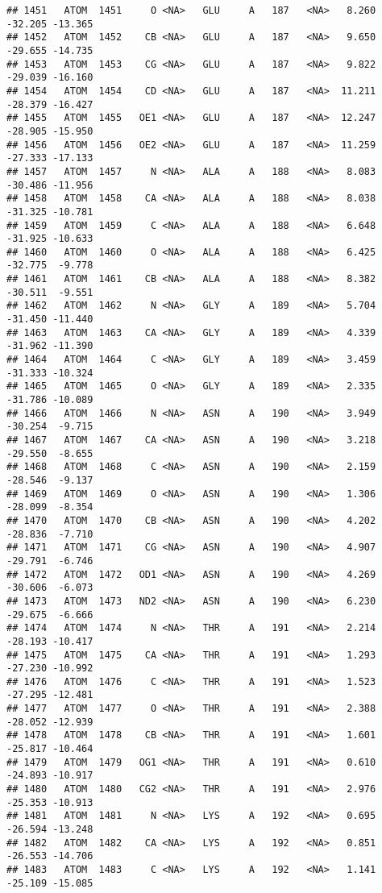 \documentclass[
]{article}
\begin{document}
\begin{verbatim}
## 1451   ATOM  1451     O <NA>   GLU     A   187   <NA>   8.260 -32.205 -13.365
## 1452   ATOM  1452    CB <NA>   GLU     A   187   <NA>   9.650 -29.655 -14.735
## 1453   ATOM  1453    CG <NA>   GLU     A   187   <NA>   9.822 -29.039 -16.160
## 1454   ATOM  1454    CD <NA>   GLU     A   187   <NA>  11.211 -28.379 -16.427
## 1455   ATOM  1455   OE1 <NA>   GLU     A   187   <NA>  12.247 -28.905 -15.950
## 1456   ATOM  1456   OE2 <NA>   GLU     A   187   <NA>  11.259 -27.333 -17.133
## 1457   ATOM  1457     N <NA>   ALA     A   188   <NA>   8.083 -30.486 -11.956
## 1458   ATOM  1458    CA <NA>   ALA     A   188   <NA>   8.038 -31.325 -10.781
## 1459   ATOM  1459     C <NA>   ALA     A   188   <NA>   6.648 -31.925 -10.633
## 1460   ATOM  1460     O <NA>   ALA     A   188   <NA>   6.425 -32.775  -9.778
## 1461   ATOM  1461    CB <NA>   ALA     A   188   <NA>   8.382 -30.511  -9.551
## 1462   ATOM  1462     N <NA>   GLY     A   189   <NA>   5.704 -31.450 -11.440
## 1463   ATOM  1463    CA <NA>   GLY     A   189   <NA>   4.339 -31.962 -11.390
## 1464   ATOM  1464     C <NA>   GLY     A   189   <NA>   3.459 -31.333 -10.324
## 1465   ATOM  1465     O <NA>   GLY     A   189   <NA>   2.335 -31.786 -10.089
## 1466   ATOM  1466     N <NA>   ASN     A   190   <NA>   3.949 -30.254  -9.715
## 1467   ATOM  1467    CA <NA>   ASN     A   190   <NA>   3.218 -29.550  -8.655
## 1468   ATOM  1468     C <NA>   ASN     A   190   <NA>   2.159 -28.546  -9.137
## 1469   ATOM  1469     O <NA>   ASN     A   190   <NA>   1.306 -28.099  -8.354
## 1470   ATOM  1470    CB <NA>   ASN     A   190   <NA>   4.202 -28.836  -7.710
## 1471   ATOM  1471    CG <NA>   ASN     A   190   <NA>   4.907 -29.791  -6.746
## 1472   ATOM  1472   OD1 <NA>   ASN     A   190   <NA>   4.269 -30.606  -6.073
## 1473   ATOM  1473   ND2 <NA>   ASN     A   190   <NA>   6.230 -29.675  -6.666
## 1474   ATOM  1474     N <NA>   THR     A   191   <NA>   2.214 -28.193 -10.417
## 1475   ATOM  1475    CA <NA>   THR     A   191   <NA>   1.293 -27.230 -10.992
## 1476   ATOM  1476     C <NA>   THR     A   191   <NA>   1.523 -27.295 -12.481
## 1477   ATOM  1477     O <NA>   THR     A   191   <NA>   2.388 -28.052 -12.939
## 1478   ATOM  1478    CB <NA>   THR     A   191   <NA>   1.601 -25.817 -10.464
## 1479   ATOM  1479   OG1 <NA>   THR     A   191   <NA>   0.610 -24.893 -10.917
## 1480   ATOM  1480   CG2 <NA>   THR     A   191   <NA>   2.976 -25.353 -10.913
## 1481   ATOM  1481     N <NA>   LYS     A   192   <NA>   0.695 -26.594 -13.248
## 1482   ATOM  1482    CA <NA>   LYS     A   192   <NA>   0.851 -26.553 -14.706
## 1483   ATOM  1483     C <NA>   LYS     A   192   <NA>   1.141 -25.109 -15.085

\end{verbatim}
\end{document}
